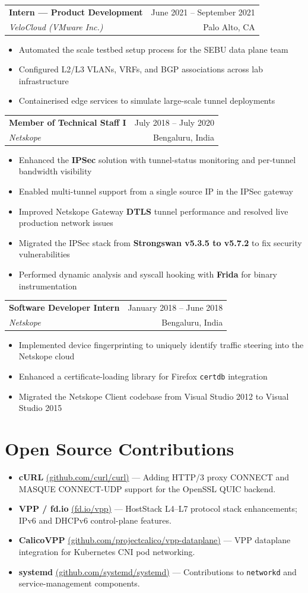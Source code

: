 \documentclass[a4paper,10pt]{article}
\makeatletter
\newcommand{\cvperiod}[1]{{\small\color{lighttext}#1}}
\newcommand{\cvloc}[1]{{\small\color{lighttext}\faMapMarkerAlt\ #1}}
\newenvironment{cventry}[4]{%
  \vspace{3pt}%
  \begin{tabularx}{\textwidth}{@{}X r@{}}
    \textbf{#1} & \cvperiod{#2} \\[-1pt]
    \textit{\color{midtext}#3} & \cvloc{#4}
  \end{tabularx}%
  \vspace{1pt}%
  \begin{itemize}[leftmargin=1.4em, itemsep=0pt, topsep=2pt, parsep=0pt, label={$\circ$}]
}{%
  \end{itemize}%
  \vspace{1pt}%
}
\newcommand{\cb}[1]{\item \small #1}
\makeatother
\begin{document}
\begin{cventry}{Intern — Product Development}{June 2021 – September 2021}{VeloCloud (VMware Inc.)}{Palo Alto, CA}
  \cb{Automated the scale testbed setup process for the SEBU data plane team}
  \cb{Configured L2/L3 VLANs, VRFs, and BGP associations across lab infrastructure}
  \cb{Containerised edge services to simulate large-scale tunnel deployments}
\end{cventry}

\begin{cventry}{Member of Technical Staff I}{July 2018 – July 2020}{Netskope}{Bengaluru, India}
  \cb{Enhanced the \textbf{IPSec} solution with tunnel-status monitoring and per-tunnel bandwidth visibility}
  \cb{Enabled multi-tunnel support from a single source IP in the IPSec gateway}
  \cb{Improved Netskope Gateway \textbf{DTLS} tunnel performance and resolved live production network issues}
  \cb{Migrated the IPSec stack from \textbf{Strongswan v5.3.5 to v5.7.2} to fix security vulnerabilities}
  \cb{Performed dynamic analysis and syscall hooking with \textbf{Frida} for binary instrumentation}
\end{cventry}

\begin{cventry}{Software Developer Intern}{January 2018 – June 2018}{Netskope}{Bengaluru, India}
  \cb{Implemented device fingerprinting to uniquely identify traffic steering into the Netskope cloud}
  \cb{Enhanced a certificate-loading library for Firefox \texttt{certdb} integration}
  \cb{Migrated the Netskope Client codebase from Visual Studio 2012 to Visual Studio 2015}
\end{cventry}

\section{Open Source Contributions}

\begin{itemize}[leftmargin=1.4em, itemsep=4pt, topsep=2pt, parsep=0pt, label={$\circ$}]
  \item \textbf{cURL} \textcolor{lighttext}{\href{https://github.com/curl/curl}{\small(github.com/curl/curl)}} —
    Adding HTTP/3 proxy CONNECT and MASQUE CONNECT-UDP support for the OpenSSL QUIC backend.
  \item \textbf{VPP / fd.io} \textcolor{lighttext}{\href{https://fd.io}{\small(fd.io/vpp)}} —
    HostStack L4–L7 protocol stack enhancements; IPv6 and DHCPv6 control-plane features.
  \item \textbf{CalicoVPP} \textcolor{lighttext}{\href{https://github.com/projectcalico/vpp-dataplane}{\small(github.com/projectcalico/vpp-dataplane)}} —
    VPP dataplane integration for Kubernetes CNI pod networking.
  \item \textbf{systemd} \textcolor{lighttext}{\href{https://github.com/systemd/systemd}{\small(github.com/systemd/systemd)}} —
    Contributions to \texttt{networkd} and service-management components.
\end{itemize}
\end{document}
